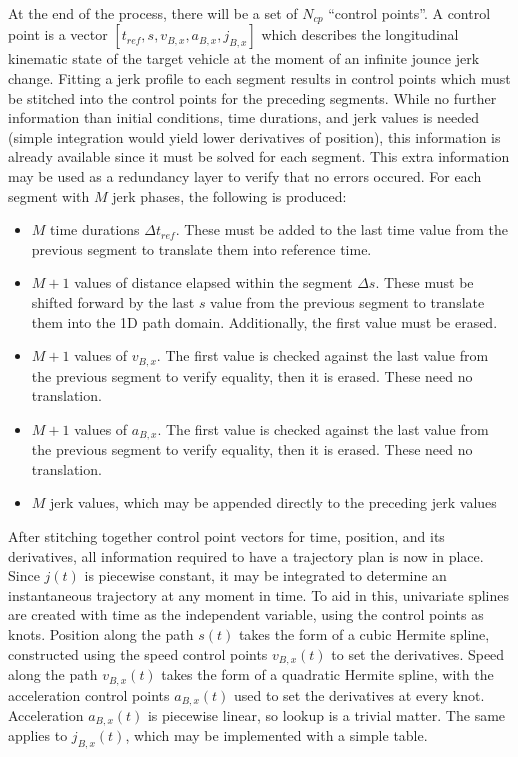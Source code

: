 \documentclass[letterpaper, 10 pt, conference]{ieeeconf}  %
\begin{document}
At the end of the process, there will be a set of $N_{cp}$ ``control points''. A control point is a vector $[t_{ref}, s, v_{B,x}, a_{B,x}, j_{B,x}]$ which describes the longitudinal kinematic state of the target vehicle at the moment of an infinite jounce jerk change.
Fitting a jerk profile to each segment results in control points which must be stitched into the control points for the preceding segments.
While no further information than initial conditions, time durations, and jerk values is needed (simple integration would yield lower derivatives of position), this information is already available since it must be solved for each segment.
This extra information may be used as a redundancy layer to verify that no errors occured.
For each segment with $M$ jerk phases, the following is produced:
\begin{itemize}
  \item $M$ time durations $\Delta t_{ref}$. These must be added to the last time value from the previous segment to translate them into reference time.
  \item $M+1$ values of distance elapsed within the segment $\Delta s$. These must be shifted forward by the last $s$ value from the previous segment to translate them into the 1D path domain. Additionally, the first value must be erased.
  \item $M+1$ values of $v_{B,x}$. The first value is checked against the last value from the previous segment to verify equality, then it is erased. These need no translation.
  \item $M+1$ values of $a_{B,x}$. The first value is checked against the last value from the previous segment to verify equality, then it is erased. These need no translation.
  \item $M$ jerk values, which may be appended directly to the preceding jerk values
\end{itemize}

After stitching together control point vectors for time, position, and its derivatives, all information required to have a trajectory plan is now in place.
Since $j(t)$ is piecewise constant, it may be integrated to determine an instantaneous trajectory at any moment in time.
To aid in this, univariate splines are created with time as the independent variable, using the control points as knots.
Position along the path $s(t)$ takes the form of a cubic Hermite spline, constructed using the speed control points $v_{B,x}(t)$ to set the derivatives.
Speed along the path $v_{B,x}(t)$ takes the form of a quadratic Hermite spline, with the acceleration control points $a_{B,x}(t)$ used to set the derivatives at every knot.
Acceleration $a_{B,x}(t)$ is piecewise linear, so lookup is a trivial matter.
The same applies to $j_{B,x}(t)$, which may be implemented with a simple table.
\end{document}
